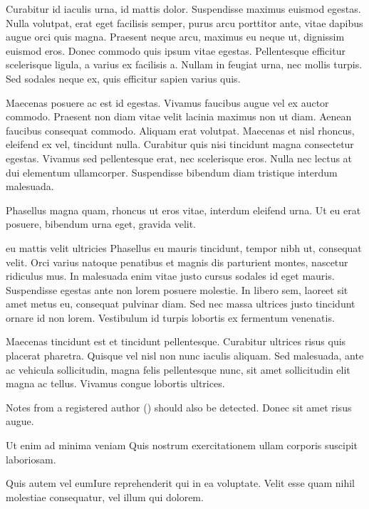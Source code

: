 \documentclass[draft]{article}
\begin{document}
Curabitur id iaculis urna, id mattis dolor.
{Suspendisse maximus euismod egestas. Nulla volutpat, erat eget
  facilisis semper, purus arcu porttitor ante, vitae dapibus augue orci
quis magna.}
Praesent neque arcu, maximus eu neque ut, dignissim euismod eros. Donec commodo
quis ipsum vitae egestas. Pellentesque efficitur scelerisque ligula, a varius ex
facilisis a. Nullam in feugiat urna, nec mollis turpis. Sed sodales neque ex,
quis efficitur sapien varius quis. 

Maecenas posuere ac est id egestas. Vivamus faucibus augue vel ex auctor
commodo.  Praesent non diam vitae
velit lacinia maximus non ut diam. Aenean faucibus consequat commodo. Aliquam
erat volutpat.  Maecenas et nisl rhoncus, eleifend ex vel, tincidunt nulla.
Curabitur quis nisi tincidunt magna consectetur egestas. Vivamus sed
pellentesque erat, nec scelerisque eros. Nulla nec lectus at dui elementum
ullamcorper. Suspendisse bibendum diam tristique interdum malesuada.

Phasellus magna quam, rhoncus ut eros vitae, interdum eleifend urna. Ut eu erat
posuere, bibendum urna eget, gravida velit.
\begin{anfxwarning*}{eu mattis velit ultricies}
  {Phasellus eu mauris tincidunt, tempor nibh ut, consequat velit. Orci varius
  natoque penatibus et magnis dis parturient montes, nascetur ridiculus mus. }
  In malesuada enim vitae justo cursus sodales id eget mauris. Suspendisse
  egestas ante non lorem posuere molestie. In libero sem, laoreet sit amet metus
  eu, consequat pulvinar diam. Sed nec massa ultrices justo tincidunt ornare id
  non lorem. Vestibulum id turpis lobortis ex fermentum venenatis.
\end{anfxwarning*}
Maecenas tincidunt est et tincidunt
pellentesque. Curabitur ultrices risus quis placerat pharetra. Quisque vel nisl
non nunc iaculis aliquam. Sed malesuada, ante ac vehicula sollicitudin, magna
felis pellentesque nunc, sit amet sollicitudin elit magna ac tellus. Vivamus
congue lobortis ultrices.

Notes from a registered author (\FXRegisterAuthor) should also be detected.
Donec sit amet risus augue. 

\begin{ajdwarning}{Ut enim ad minima veniam}
  Quis nostrum exercitationem ullam corporis suscipit laboriosam.
\end{ajdwarning}

\begin{ajdnote*}{Quis autem vel eum}{Iure reprehenderit qui in ea voluptate.}
  Velit esse quam nihil molestiae consequatur, vel illum qui dolorem.
\end{ajdnote*}
\end{document}
